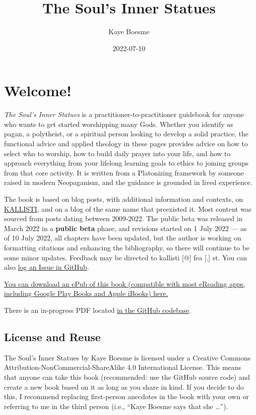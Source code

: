 \documentclass[
]{book}
\title{The Soul's Inner Statues}
\author{Kaye Boesme}
\date{2022-07-10}
\begin{document}
\maketitle

{
\setcounter{tocdepth}{1}
\tableofcontents
}
\hypertarget{welcome}{%
\chapter{Welcome!}\label{welcome}}

\emph{The Soul's Inner Statues} is a practitioner-to-practitioner guidebook for anyone who wants to get started worshipping many Gods. Whether you identify as pagan, a polytheist, or a spiritual person looking to develop a solid practice, the functional advice and applied theology in these pages provides advice on how to select who to worship, how to build daily prayer into your life, and how to approach everything from your lifelong learning goals to ethics to joining groups from that core activity. It is written from a Platonizing framework by someone raised in modern Neopaganism, and the guidance is grounded in lived experience.

The book is based on blog posts, with additional information and contexts, on \href{https://kallisti.blog}{KALLISTI}, and on a blog of the same name that preexisted it. Most content was sourced from posts dating between 2009-2022. The public beta was released in March 2022 in a \textbf{public beta} phase, and revisions started on 1 July 2022 --- as of 10 July 2022, all chapters have been updated, but the author is working on formatting citations and enhancing the bibliography, so there will continue to be some minor updates. Feedback may be directed to kallisti {[}@{]} fea {[}.{]} st. You can also \href{https://github.com/kayeofswords/soulsinnerstatues/}{log an Issue in GitHub}.

\href{souls-inner-statues.epub}{You can download an ePub of this book (compatible with most eReading apps, including Google Play Books and Apple iBooks) here.}

There is an in-progress PDF located \href{https://github.com/kayeofswords/soulsinnerstatues/tree/master/docs}{in the GitHub codebase}.

\hypertarget{license-and-reuse}{%
\section{License and Reuse}\label{license-and-reuse}}

{The Soul's Inner Statues} by Kaye Boesme is licensed under a Creative Commons Attribution-NonCommercial-ShareAlike 4.0 International License. This means that anyone can take this book (recommended: use the GitHub source code) and create a new book based on it as long as you share in kind. If you decide to do this, I recommend replacing first-person anecdotes in the book with your own or referring to me in the third person (i.e., ``Kaye Boesme says that she \ldots{}'').
\end{document}
